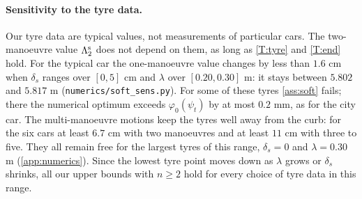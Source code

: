 \paragraph{Sensitivity to the tyre data.}
Our tyre data are typical values, not measurements of particular cars.
The two-manoeuvre value $\Lambda_2^{\rm s}$ does not depend on them, as long as \ref{T:tyre} and \ref{T:end} hold.
For the typical car the one-manoeuvre value changes by less than $1.6$ cm when $\delta_s$ ranges over $[0,5]$ cm and $\lambda$ over $[0.20,0.30]$ m: it stays between $5.802$ and $5.817$ m (\texttt{numerics/soft\_sens.py}).
For some of these tyres \cref{ass:soft} fails; there the numerical optimum exceeds $\varphi_0(\psi_t)$ by at most $0.2$ mm, as for the city car.
The multi-manoeuvre motions keep the tyres well away from the curb: for the six cars at least $6.7$ cm with two manoeuvres and at least $11$ cm with three to five.
They all remain free for the largest tyres of this range, $\delta_s=0$ and $\lambda=0.30$ m (\cref{app:numerics}).
Since the lowest tyre point moves down as $\lambda$ grows or $\delta_s$ shrinks, all our upper bounds with $n\ge2$ hold for every choice of tyre data in this range.
